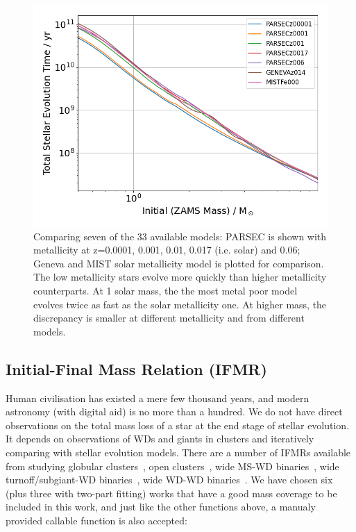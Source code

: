 \documentclass[fleqn,usenatbib]{rasti}
\begin{document}
\begin{figure}
    \centering
    \includegraphics[width=\columnwidth]{total_stellar_lifetime.png}
    \caption{Comparing seven of the 33 available models: PARSEC is shown with
    metallicity at z=0.0001, 0.001, 0.01, 0.017 (i.e. solar) and 0.06; Geneva
    and MIST solar metallicity model is plotted for comparison. The low
    metallicity stars evolve more quickly than higher metallicity counterparts.
    At 1 solar mass, the the most metal poor model evolves twice as fast as the
    solar metallicity one. At higher mass, the discrepancy is smaller at
    different metallicity and from different models.}
    \label{fig:total_stellar_lifetime}
\end{figure}


\subsection{Initial-Final Mass Relation (IFMR)}
Human civilisation has existed a mere few thousand years, and modern astronomy
(with digital aid) is no more than a hundred. We do not have direct
observations on the total mass loss of a star at the end stage of stellar
evolution. It depends on observations of WDs and giants in clusters and
iteratively comparing with stellar evolution models. There are a number of
IFMRs available from studying globular clusters~\citep{2004A&A...420..515M,
2009ApJ...705..408K}, open clusters~\citep{2009ApJ...693..355W,
2016ApJ...818...84C}, wide MS-WD binaries~\citep{2008A&A...477..213C,
2012ApJ...746..144Z, 2018ApJ...860L..17E}, wide turnoff/subgiant-WD
binaries~\citep{2021ApJ...923..181B}, wide WD-WD
binaries~\citep{2015ASPC..493..325C, 2015ApJ...815...63A, 2018ApJ...866...21C}.
We have chosen six (plus three with two-part fitting) works that have a
good mass coverage to be included in this work, and just like the other
functions above, a manualy provided callable function is also accepted:
\end{document}
